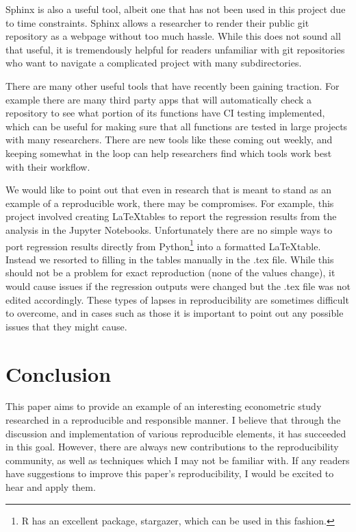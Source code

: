 \documentclass[12pt]{article}
\begin{document}
Sphinx is also a useful tool, albeit one that has not been used in this project due to time constraints. Sphinx allows a researcher to render their public git repository as a webpage without too much hassle. While this does not sound all that useful, it is tremendously helpful for readers unfamiliar with git repositories who want to navigate a complicated project with many subdirectories. 

There are many other useful tools that have recently been gaining traction. For example there are many third party apps that will automatically check a repository to see what portion of its functions have CI testing implemented, which can be useful for making sure that all functions are tested in large projects with many researchers. There are new tools like these coming out weekly, and keeping somewhat in the loop can help researchers find which tools work best with their workflow.

We would like to point out that even in research that is meant to stand as an example of a reproducible work, there may be compromises. For example, this project involved creating \LaTeX tables to report the regression results from the analysis in the Jupyter Notebooks. Unfortunately there are no simple ways to port regression results directly from Python\footnote{R has an excellent package, stargazer, which can be used in this fashion.} into a formatted \LaTeX table. Instead we resorted to filling in the tables manually in the .tex file. While this should not be a problem for exact reproduction (none of the values change), it would cause issues if the regression outputs were changed but the .tex file was not edited accordingly. These types of lapses in reproducibility are sometimes difficult to overcome, and in cases such as those it is important to point out any possible issues that they might cause.


\newpage
\section{Conclusion}
This paper aims to provide an example of an interesting econometric study researched in a reproducible and responsible manner. I believe that through the discussion and implementation of various reproducible elements, it has succeeded in this goal. However, there are always new contributions to the reproducibility community, as well as techniques which I may not be familiar with. If any readers have suggestions to improve this paper's reproducibility, I would be excited to hear and apply them.
\end{document}
